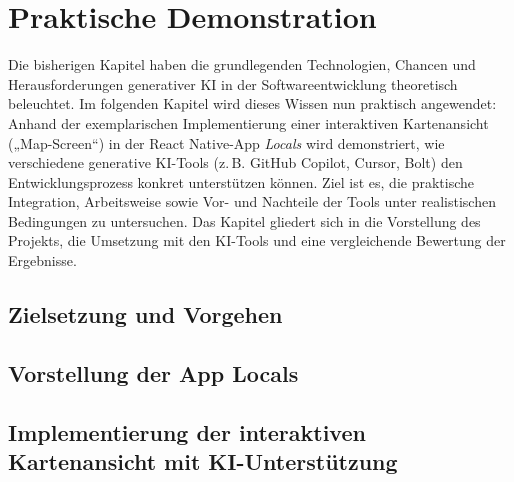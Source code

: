 \chapter{Praktische Demonstration}
Die bisherigen Kapitel haben die grundlegenden Technologien, Chancen und
Herausforderungen generativer KI in der Softwareentwicklung theoretisch
beleuchtet. Im folgenden Kapitel wird dieses Wissen nun praktisch angewendet:
Anhand der exemplarischen Implementierung einer interaktiven Kartenansicht
(„Map-Screen“) in der React Native-App \textit{Locals} wird demonstriert, wie
verschiedene generative KI-Tools (z.\,B. GitHub Copilot, Cursor, Bolt) den
Entwicklungsprozess konkret unterstützen können. Ziel ist es, die praktische
Integration, Arbeitsweise sowie Vor- und Nachteile der Tools unter
realistischen Bedingungen zu untersuchen. Das Kapitel gliedert sich in die
Vorstellung des Projekts, die Umsetzung mit den KI-Tools und eine vergleichende
Bewertung der Ergebnisse.

\section{Zielsetzung und Vorgehen}


\section{Vorstellung der App \glqq Locals\grqq}


\section{Implementierung der interaktiven Kartenansicht mit KI-Unterstützung}


% 

% 